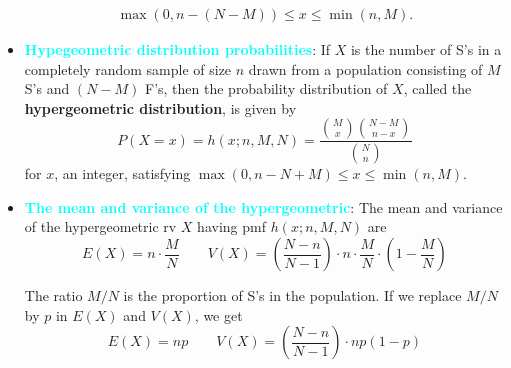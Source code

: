 \documentclass{report}
\begin{document}
\begin{itemize}
        \begin{align*}
            \max (0, n - (N - M)) \leq x \leq \min (n, M)
        .\end{align*}
    \item \textbf{\textcolor{cyan}{Hypegeometric distribution probabilities}}:
        If $X$ is the number of S's in a completely random sample of size $n$ drawn from a population consisting of $M$ S's and $(N - M)$ F's, then the probability distribution of $X$, called the \textbf{hypergeometric distribution}, is given by
        \[
            P(X = x) = h(x; n, M, N) = \frac{\binom{M}{x} \binom{N - M}{n - x}}{\binom{N}{n}}
        \]
        for $x$, an integer, satisfying $\max (0, n - N + M) \leq x \leq \min (n, M)$.
    \item \textbf{\textcolor{cyan}{The mean and variance of the hypergeometric}}:
        The mean and variance of the hypergeometric rv $X$ having pmf $h(x; n, M, N)$ are
        \[
            E(X) = n \cdot \frac{M}{N} \qquad V(X) = \left( \frac{N - n}{N - 1} \right) \cdot n \cdot \frac{M}{N} \cdot \left( 1 - \frac{M}{N} \right)
        \]

        The ratio $M/N$ is the proportion of S's in the population. If we replace $M/N$ by $p$ in $E(X)$ and $V(X)$, we get
        \[
            E(X) = np \qquad V(X) = \left( \frac{N - n}{N - 1} \right) \cdot np(1 - p)
        \]


\end{itemize}
\end{document}
